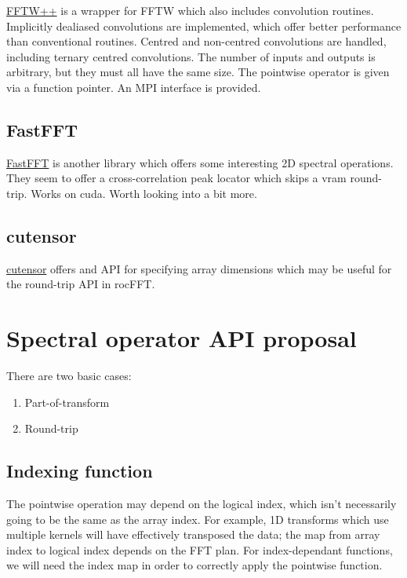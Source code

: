 \documentclass[12pt]{article}
\renewcommand{\(}{\left(}
\renewcommand{\)}{\right)}
\begin{document}
\href{https://github.com/dealias/fftwpp}{FFTW++} is a wrapper for FFTW
which also includes convolution routines.  Implicitly dealiased
convolutions are implemented, which offer better performance than
conventional routines.  Centred and non-centred convolutions are
handled, including ternary centred convolutions.  The number of
inputs and outputs is arbitrary, but they must all have the same size.
The pointwise operator is given via a function pointer.  An MPI
interface is provided.

\subsection{FastFFT}
\href{https://github.com/StochasticAnalytics/FastFFT/}{FastFFT} is
another library which offers some interesting 2D spectral operations.
They seem to offer a cross-correlation peak locator which skips a vram
round-trip.  Works on cuda.  Worth looking into a bit more.

\subsection{cutensor}
\href{https://docs.nvidia.com/cuda/cutensor/getting_started.html}{cutensor}
offers and API for specifying array dimensions which may be useful for
the round-trip API in rocFFT.

\section{Spectral operator API proposal}

There are two basic cases:
\begin{enumerate}
\item Part-of-transform
\item Round-trip
\end{enumerate}

\subsection{Indexing function}

The pointwise operation may depend on the logical index, which isn't
necessarily going to be the same as the array index.  For example, 1D
transforms which use multiple kernels will have effectively transposed
the data; the map from array index to logical index depends on the FFT
plan.  For index-dependant functions, we will need the index map in
order to correctly apply the pointwise function.
\end{document}
